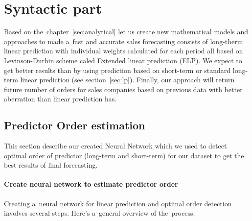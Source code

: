\chapter{Syntactic part}\label{sec:syntactic}
Based on the~chapter~\ref{sec:analytical} let us create new mathematical models and approaches to made a~fast
and accurate sales forecasting consists of long-therm linear prediction with individual weights calculated for each
period all based on Levinson-Durbin scheme caled Extended linear prediction (ELP).
We expect to get better results than by using prediction based on short-term or standard long-term linear
prediction (see section~\ref{sec:lp}).  Finally, our approach will return future number of orders for sales companies
based on previous data with better aberration than linear prediction has.
    \section{Predictor Order estimation}\label{sec:ordercalc}
        This section describe our created Neural Network which we used to detect optimal order of predictor (long-term and short-term) for our dataset to get the best results of final forecasting.\\
        \\
        \textbf{Create neural network to estimate predictor order}\\
        \\
        Creating a~neural network for linear prediction and optimal order detection involves several steps.
        Here's a~general overview of the~process:
